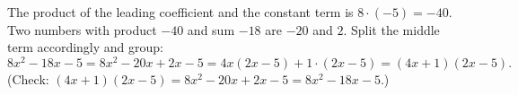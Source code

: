The product of the leading coefficient and the constant term is $8\cdot(-5)=-40$. Two numbers with product $-40$ and sum $-18$ are $-20$ and $2$. Split the middle term accordingly and group:
\[8x^2-18x-5=8x^2-20x+2x-5=4x(2x-5)+1\cdot(2x-5)=\boxed{(4x+1)(2x-5)}.\]
(Check: $(4x+1)(2x-5)=8x^2-20x+2x-5=8x^2-18x-5$.)

